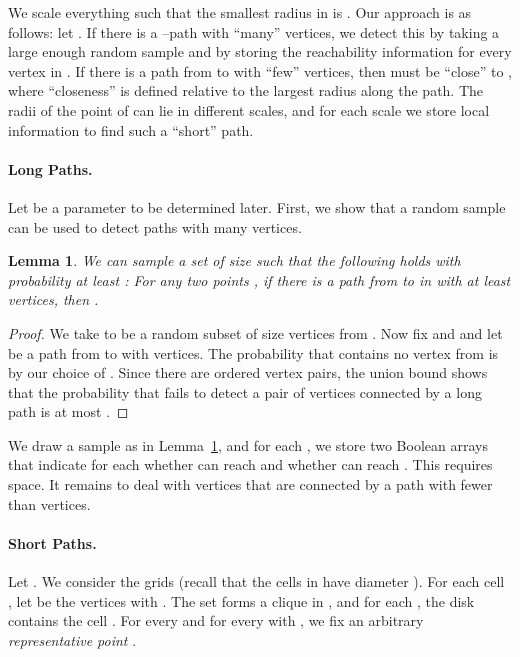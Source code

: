 \documentclass[11pt,a4paper]{paper}
\newtheorem{lemma}[theorem]{Lemma}
\begin{document}
We scale everything such that the smallest radius in
 is .
Our approach is as follows: let .
If there is a --path  with  ``many'' vertices, we detect
this by taking a large enough
random sample  and by storing the
reachability information for every vertex in .
If there is a path from  to  with ``few'' vertices, then 
must be ``close'' to , where ``closeness'' is defined relative to
the largest radius along the path. The radii of the point of  can lie in
 different scales, and for each scale we
store local information to find such a ``short'' path.

\paragraph*{Long Paths.}
Let  be a parameter to be
determined later.
First, we show that a random sample can be used to detect paths with
many vertices.

\begin{lemma}\label{lem:sampling}
We can sample a set  of size  such that
the following holds with  probability
at least : For any two points
, if there is a path  from  to  in  with
at least  vertices, then .
\end{lemma}

\begin{proof}
We take  to be a random subset of size
  vertices from .
Now fix  and  and let  be a path from  to  with
 vertices.
The probability that  contains no vertex from  is
 by our choice of .
Since there are  ordered vertex pairs, the union bound
shows that the probability that  fails to detect a pair of
vertices connected by a long path is at most
.
\end{proof}

We draw a sample  as in Lemma~\ref{lem:sampling}, and for
each , we store two Boolean arrays that indicate for each
 whether  can reach  and whether  can reach
. This requires  space.
It remains to deal with vertices that are connected by a path with
fewer than  vertices.

\paragraph{Short Paths.}
Let . We consider the  grids
 (recall that the cells in  have
diameter ). For each cell , let
 be the vertices  with .
The set  forms a clique in , and for each
, the disk  contains the cell
. For every  and for every 
with ,
we fix an arbitrary  \emph{representative point}
.
\end{document}
